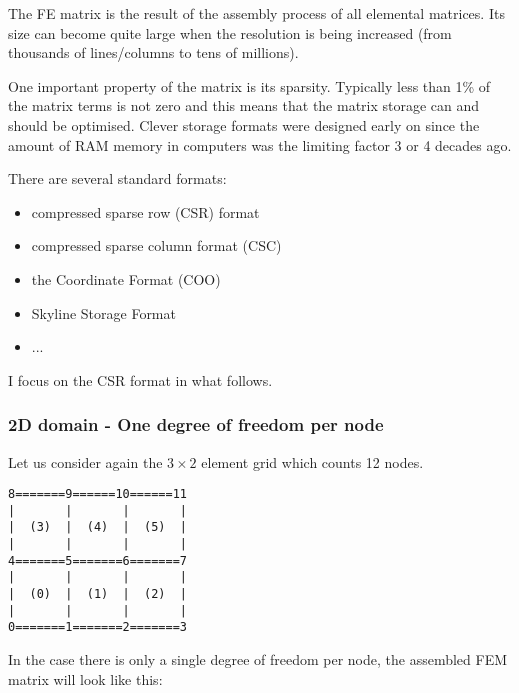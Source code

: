 The FE matrix is the result of the assembly process of all elemental matrices. 
Its size can become quite large when the resolution is being increased (from thousands
of lines/columns to tens of millions).

One important property of the matrix is its sparsity. Typically less than 1\% of the 
matrix terms is not zero and this means that the matrix storage can and should be optimised. 
Clever storage formats were designed early on since the amount of RAM memory in computers
was the limiting factor 3 or 4 decades ago. \cite{saad}

There are several standard formats:
\begin{itemize}
\item compressed sparse row (CSR) format 
\item compressed sparse column format (CSC)  
\item the Coordinate Format (COO)
\item Skyline Storage Format
\item ...
\end{itemize}

I focus on  the CSR format in what follows. 

\subsubsection{2D domain - One degree of freedom per node}

Let us consider again the  $3\times2$ element grid which counts 12 nodes.
\begin{verbatim}
8=======9======10======11
|       |       |       |
|  (3)  |  (4)  |  (5)  |
|       |       |       |
4=======5=======6=======7
|       |       |       |
|  (0)  |  (1)  |  (2)  |
|       |       |       |
0=======1=======2=======3
\end{verbatim}

In the case there is only a single degree of freedom per node, the 
assembled FEM matrix will look like this:


